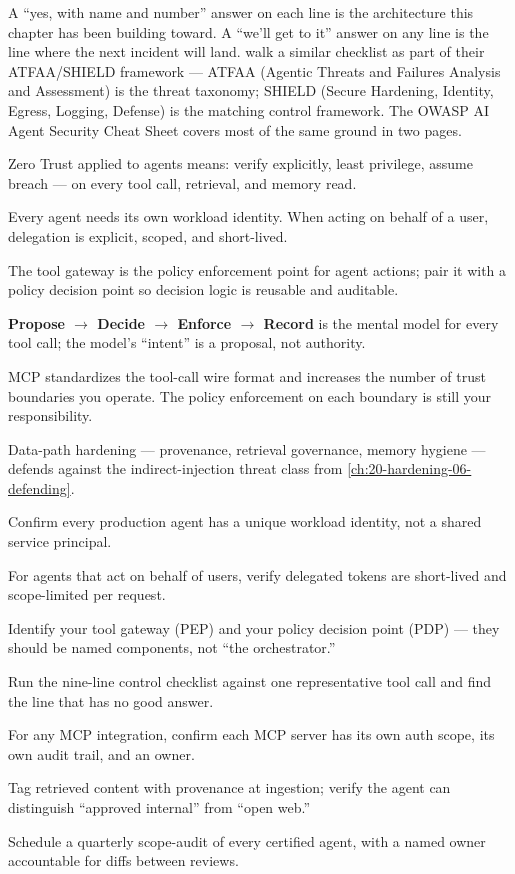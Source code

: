 A ``yes, with name and number'' answer on each line is the architecture this chapter has been building toward. A ``we'll get to it'' answer on any line is the line where the next incident will land. \citet{narajala2025securing} walk a similar checklist as part of their ATFAA/SHIELD framework --- ATFAA (Agentic Threats and Failures Analysis and Assessment) is the threat taxonomy; SHIELD (Secure Hardening, Identity, Egress, Logging, Defense) is the matching control framework. The OWASP AI Agent Security Cheat Sheet covers most of the same ground in two pages.

\TNrule

\stoptwocol

\begin{TNkeytakeaways}
\item Zero Trust applied to agents means: verify explicitly, least privilege, assume breach --- on every tool call, retrieval, and memory read.
\item Every agent needs its own workload identity. When acting on behalf of a user, delegation is explicit, scoped, and short-lived.
\item The tool gateway is the policy enforcement point for agent actions; pair it with a policy decision point so decision logic is reusable and auditable.
\item \textbf{Propose $\rightarrow$ Decide $\rightarrow$ Enforce $\rightarrow$ Record} is the mental model for every tool call; the model's ``intent'' is a proposal, not authority.
\item MCP standardizes the tool-call wire format and increases the number of trust boundaries you operate. The policy enforcement on each boundary is still your responsibility.
\item Data-path hardening --- provenance, retrieval governance, memory hygiene --- defends against the indirect-injection threat class from \autoref{ch:20-hardening-06-defending}.
\end{TNkeytakeaways}

\begin{TNchecklist}
\item Confirm every production agent has a unique workload identity, not a shared service principal.
\item For agents that act on behalf of users, verify delegated tokens are short-lived and scope-limited per request.
\item Identify your tool gateway (PEP) and your policy decision point (PDP) --- they should be named components, not ``the orchestrator.''
\item Run the nine-line control checklist against one representative tool call and find the line that has no good answer.
\item For any MCP integration, confirm each MCP server has its own auth scope, its own audit trail, and an owner.
\item Tag retrieved content with provenance at ingestion; verify the agent can distinguish ``approved internal'' from ``open web.''
\item Schedule a quarterly scope-audit of every certified agent, with a named owner accountable for diffs between reviews.
\end{TNchecklist}


